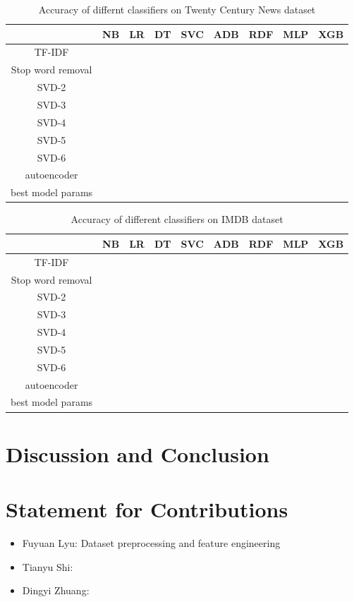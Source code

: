 \documentclass[11pt]{scrartcl}
\begin{document}
\begin{table}[H]
    \centering
    \begin{tabular}{c|cccccccc}
        \hline
         & NB   & LR & DT & SVC & ADB & RDF & MLP & XGB \\
        \hline
        TF-IDF & & & & & & & & \\
		Stop word removal & & & & & & & & \\
		SVD-2 & & & & & & & & \\
		SVD-3 & & & & & & & & \\
		SVD-4 & & & & & & & & \\
		SVD-5 & & & & & & & & \\
		SVD-6 & & & & & & & & \\
		autoencoder & & & & & & & & \\
		best model params & & & & & & & & \\
        \hline
    \end{tabular} 
    \caption{Accuracy of differnt classifiers on Twenty Century News dataset}
    \label{accuracy_20}
\end{table}

\begin{table}[H]
    \centering
    \begin{tabular}{c|cccccccc}
        \hline
         & NB   & LR & DT & SVC & ADB & RDF & MLP & XGB \\
        \hline
        TF-IDF & & & & & & & & \\
		Stop word removal & & & & & & & & \\
		SVD-2 & & & & & & & & \\
		SVD-3 & & & & & & & & \\
		SVD-4 & & & & & & & & \\
		SVD-5 & & & & & & & & \\
		SVD-6 & & & & & & & & \\
		autoencoder & & & & & & & & \\
		best model params & & & & & & & & \\
        \hline
    \end{tabular} 
    \caption{Accuracy of different classifiers on IMDB dataset}
    \label{accuracy_imdb}
\end{table}

\section{Discussion and Conclusion}

\section{Statement for Contributions}
\begin{itemize}
	\item Fuyuan Lyu: Dataset preprocessing and feature engineering
	\item Tianyu Shi:
	\item Dingyi Zhuang:
\end{itemize}



\end{document}
